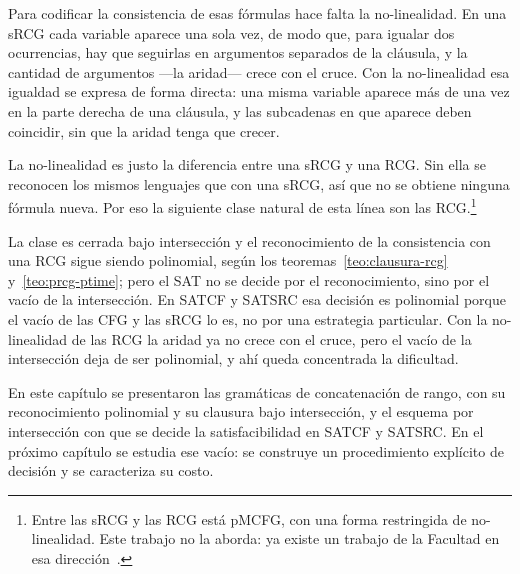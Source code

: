 \documentclass{report}
\theoremstyle{definition}
\theoremstyle{plain}
\theoremstyle{remark}
\begin{document}
Para codificar la consistencia de esas fórmulas hace falta la
no-linealidad. En una sRCG cada variable aparece una sola vez, de modo
que, para igualar dos ocurrencias, hay que seguirlas en argumentos
separados de la cláusula, y la cantidad de argumentos —la aridad— crece
con el cruce. Con la no-linealidad esa igualdad se expresa de forma
directa: una misma variable aparece más de una vez en la parte derecha
de una cláusula, y las subcadenas en que aparece deben coincidir, sin
que la aridad tenga que crecer.

La no-linealidad es justo la diferencia entre una sRCG y una RCG. Sin
ella se reconocen los mismos lenguajes que con una sRCG, así que no se
obtiene ninguna fórmula nueva. Por eso la siguiente clase natural de
esta línea son las RCG.\footnote{Entre las sRCG y las RCG está pMCFG, con una forma
restringida de no-linealidad. Este trabajo no la aborda: ya existe un
trabajo de la Facultad en esa dirección~\cite{artechemunoz2026}.}

La clase es cerrada bajo intersección y el reconocimiento de la
consistencia con una RCG sigue siendo polinomial, según los
teoremas~\ref{teo:clausura-rcg} y~\ref{teo:prcg-ptime}; pero el SAT no se
decide por el reconocimiento, sino por el vacío de la intersección. En SATCF y SATSRC
esa decisión es polinomial porque el vacío de las CFG y las sRCG lo es,
no por una estrategia particular. Con la no-linealidad de las RCG la
aridad ya no crece con el cruce, pero el vacío de la intersección deja de
ser polinomial, y ahí queda concentrada la dificultad.

En este capítulo se presentaron las gramáticas de concatenación de
rango, con su reconocimiento polinomial y su clausura bajo intersección,
y el esquema por intersección con que se decide la satisfacibilidad en
SATCF y SATSRC. En el próximo capítulo se estudia ese vacío: se
construye un procedimiento explícito de decisión y se caracteriza su
costo.



\end{document}
